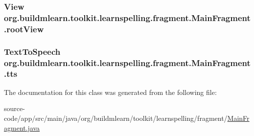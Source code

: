 \subsubsection[{\texorpdfstring{root\+View}{rootView}}]{\setlength{\rightskip}{0pt plus 5cm}View org.\+buildmlearn.\+toolkit.\+learnspelling.\+fragment.\+Main\+Fragment.\+root\+View\hspace{0.3cm}{\ttfamily [private]}}\hypertarget{classorg_1_1buildmlearn_1_1toolkit_1_1learnspelling_1_1fragment_1_1MainFragment_a98e56c573aa586a67edbf011b7d18059}{}\label{classorg_1_1buildmlearn_1_1toolkit_1_1learnspelling_1_1fragment_1_1MainFragment_a98e56c573aa586a67edbf011b7d18059}
\subsubsection[{\texorpdfstring{tts}{tts}}]{\setlength{\rightskip}{0pt plus 5cm}Text\+To\+Speech org.\+buildmlearn.\+toolkit.\+learnspelling.\+fragment.\+Main\+Fragment.\+tts\hspace{0.3cm}{\ttfamily [private]}}\hypertarget{classorg_1_1buildmlearn_1_1toolkit_1_1learnspelling_1_1fragment_1_1MainFragment_aea99947964ca03c94a307f428d5b1f07}{}\label{classorg_1_1buildmlearn_1_1toolkit_1_1learnspelling_1_1fragment_1_1MainFragment_aea99947964ca03c94a307f428d5b1f07}


The documentation for this class was generated from the following file\+:\begin{DoxyCompactItemize}
\item 
source-\/code/app/src/main/java/org/buildmlearn/toolkit/learnspelling/fragment/\hyperlink{learnspelling_2fragment_2MainFragment_8java}{Main\+Fragment.\+java}\end{DoxyCompactItemize}
